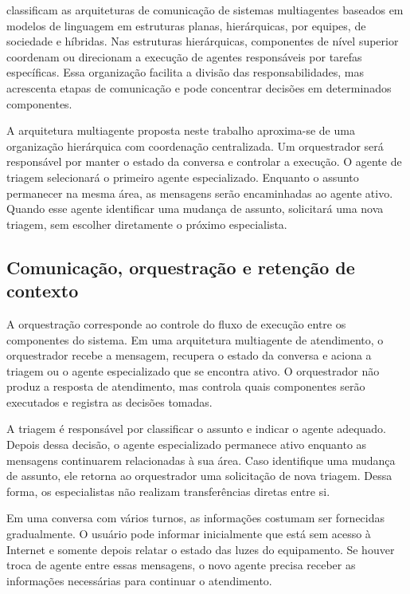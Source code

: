 \textcite{yan2026} classificam as arquiteturas de comunicação de sistemas multiagentes baseados em modelos de linguagem em estruturas planas, hierárquicas, por equipes, de sociedade e híbridas. Nas estruturas hierárquicas, componentes de nível superior coordenam ou direcionam a execução de agentes responsáveis por tarefas específicas. Essa organização facilita a divisão das responsabilidades, mas acrescenta etapas de comunicação e pode concentrar decisões em determinados componentes.

A arquitetura multiagente proposta neste trabalho aproxima-se de uma organização hierárquica com coordenação centralizada. Um orquestrador será responsável por manter o estado da conversa e controlar a execução. O agente de triagem selecionará o primeiro agente especializado. Enquanto o assunto permanecer na mesma área, as mensagens serão encaminhadas ao agente ativo. Quando esse agente identificar uma mudança de assunto, solicitará uma nova triagem, sem escolher diretamente o próximo especialista.

\subsection{Comunicação, orquestração e retenção de contexto}
\label{subsec:orquestracao}

A orquestração corresponde ao controle do fluxo de execução entre os componentes do sistema. Em uma arquitetura multiagente de atendimento, o orquestrador recebe a mensagem, recupera o estado da conversa e aciona a triagem ou o agente especializado que se encontra ativo. O orquestrador não produz a resposta de atendimento, mas controla quais componentes serão executados e registra as decisões tomadas.

A triagem é responsável por classificar o assunto e indicar o agente adequado. Depois dessa decisão, o agente especializado permanece ativo enquanto as mensagens continuarem relacionadas à sua área. Caso identifique uma mudança de assunto, ele retorna ao orquestrador uma solicitação de nova triagem. Dessa forma, os especialistas não realizam transferências diretas entre si.

Em uma conversa com vários turnos, as informações costumam ser fornecidas gradualmente. O usuário pode informar inicialmente que está sem acesso à Internet e somente depois relatar o estado das luzes do equipamento. Se houver troca de agente entre essas mensagens, o novo agente precisa receber as informações necessárias para continuar o atendimento.

